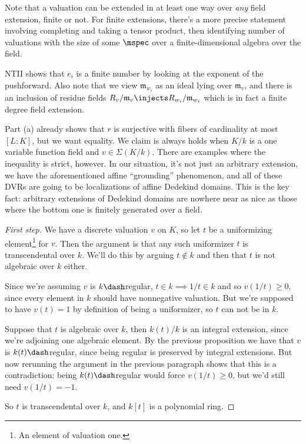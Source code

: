 \begin{remark}

Note that a valuation can be extended in at least one way over
\emph{any} field extension, finite or not. For finite extensions,
there's a more precise statement involving completing and taking a
tensor product, then identifying number of valuations with the size of
some \(\mspec\) over a finite-dimensional algebra over the field.

NTII shows that \(e_i\) is a finite number by looking at the exponent of
the pushforward. Also note that we view \(\mathfrak{m}_{w_i}\) as an
ideal lying over \(\mathfrak{m}_v\), and there is an inclusion of
residue fields
\(R_v/\mathfrak{m}_v \injects R_{w_i} / \mathfrak{m}_{w_i}\) which is in
fact a finite degree field extension.

\end{remark}

\begin{remark}

Part (a) already shows that \(r\) is surjective with fibers of
cardinality at most \([L: K]\), but we want equality. We claim is always
holds when \(K/k\) is a one variable function field and
\(v\in \Sigma(K/k)\). There are examples where the inequality is strict,
however. In our situation, it's not just an arbitrary extension, we have
the aforementioned affine ``grounding'' phenomenon, and all of these
DVRs are going to be localizations of affine Dedekind domains. This is
the key fact: arbitrary extensions of Dedekind domains are nowhere near
as nice as those where the bottom one is finitely generated over a
field.

\end{remark}

\begin{proof}[First step]

We have a discrete valuation \(v\) on \(K\), so let \(t\) be a
uniformizing element\footnote{An element of valuation one.} for \(v\).
Then the argument is that any such uniformizer \(t\) is transcendental
over \(k\). We'll do this by arguing \(t\not\in k\) and then that \(t\)
is not algebraic over \(k\) either.

Since we're assuming \(v\) is \(k\dash\)regular,
\(t\in k \implies 1/t\in k\) and so \(v(1/t) \geq 0\), since every
element in \(k\) should have nonnegative valuation. But we're supposed
to have \(v(t) = 1\) by definition of being a uniformizer, so \(t\) can
not be in \(k\).

Suppose that \(t\) is algebraic over \(k\), then \(k(t)/k\) is an
integral extension, since we're adjoining one algebraic element. By the
previous proposition we have that \(v\) is \(k(t)\dash\)regular, since
being regular is preserved by integral extensions. But now rerunning the
argument in the previous paragraph shows that this is a contradiction:
being \(k(t)\dash\)regular would force \(v(1/t) \geq 0\), but we'd still
need \(v(1/t) = -1\).

So \(t\) is transcendental over \(k\), and \(k[t]\) is a polynomial
ring.

\end{proof}

